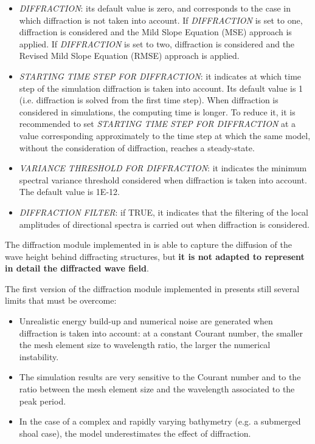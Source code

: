 \begin{itemize}
\item  \textit{DIFFRACTION}: its default value is zero, and corresponds to the case in which diffraction is not taken into account.
  If \textit{DIFFRACTION} is set to one, diffraction is considered and the Mild Slope Equation (MSE) approach is applied. If
  \textit{DIFFRACTION} is set to two, diffraction is considered and the Revised Mild Slope Equation (RMSE) approach is applied.

\item  \textit{STARTING TIME STEP FOR DIFFRACTION}: it indicates at which time step of the simulation diffraction is taken into account.
  Its default value is 1 (i.e. diffraction is solved from the first time step). When diffraction is considered in \tomawac simulations,
  the computing time is longer. To reduce it, it is recommended to set \textit{STARTING TIME STEP FOR DIFFRACTION} at a value
  corresponding approximately to the time step at which the same \tomawac model, without the consideration of diffraction, reaches a
  steady-state.

\item  \textit{VARIANCE THRESHOLD FOR DIFFRACTION}: it indicates the minimum spectral variance threshold considered when diffraction is
  taken into account. The default value is 1E-12.

\item  \textit{DIFFRACTION FILTER}: if TRUE, it indicates that the filtering of the local amplitudes of directional spectra is carried
  out when diffraction is considered.
\end{itemize}

The diffraction module implemented in \tomawac is able to capture the diffusion of the wave height behind diffracting structures, but
\textbf{it is not adapted to represent in detail the diffracted wave field}.

 The first version of the diffraction module implemented in \tomawac presents still several limits that must be overcome:

\begin{itemize}
\item  Unrealistic energy build-up and numerical noise are generated when diffraction is taken into account: at a constant Courant
  number, the smaller the mesh element size to wavelength ratio, the larger the numerical instability.

\item  The simulation results are very sensitive to the Courant number and to the ratio between the mesh element size and the
  wavelength associated to the peak period.

\item  In the case of a complex and rapidly varying bathymetry (e.g. a submerged shoal case), the model underestimates the effect of
  diffraction.
\end{itemize}

